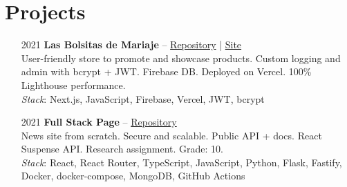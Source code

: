 \section*{Projects}
\begin{itemize}
    \item[2021] \textbf{Las Bolsitas de Mariaje} -- \href{https://github.com/aitorru/las-bolsitas-de-mariaje}{Repository} | \href{https://www.lasbolsitasdemariaje.es/}{Site}\\
    User-friendly store to promote and showcase products. Custom logging and admin with bcrypt + JWT. Firebase DB. Deployed on Vercel. 100\% Lighthouse performance.\\
    \emph{Stack}: Next.js, JavaScript, Firebase, Vercel, JWT, bcrypt
    \item[2021] \textbf{Full Stack Page} -- \href{https://github.com/aitorru/fullstack-page}{Repository}\\
    News site from scratch. Secure and scalable. Public API + docs. React Suspense API. Research assignment. Grade: 10.\\
    \emph{Stack}: React, React Router, TypeScript, JavaScript, Python, Flask, Fastify, Docker, docker-compose, MongoDB, GitHub Actions
\end{itemize}

